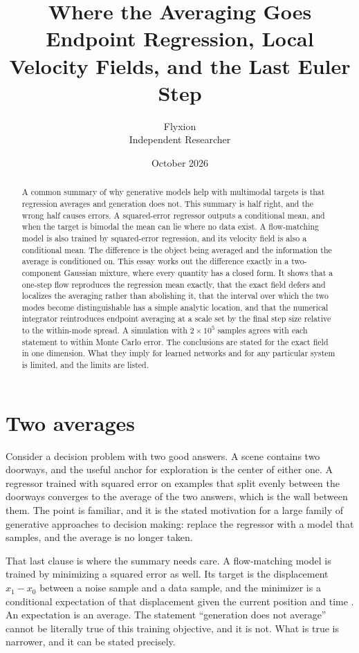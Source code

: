\documentclass[11pt]{article}
\title{Where the Averaging Goes\\[4pt]
\large Endpoint Regression, Local Velocity Fields, and the Last Euler Step}
\author{Flyxion\\Independent Researcher}
\date{October 2026}
\theoremstyle{definition}
\begin{document}
\maketitle

\begin{abstract}
\noindent
A common summary of why generative models help with multimodal targets is that regression averages and generation does not. This summary is half right, and the wrong half causes errors. A squared-error regressor outputs a conditional mean, and when the target is bimodal the mean can lie where no data exist. A flow-matching model is also trained by squared-error regression, and its velocity field is also a conditional mean. The difference is the object being averaged and the information the average is conditioned on. This essay works out the difference exactly in a two-component Gaussian mixture, where every quantity has a closed form. It shows that a one-step flow reproduces the regression mean exactly, that the exact field defers and localizes the averaging rather than abolishing it, that the interval over which the two modes become distinguishable has a simple analytic location, and that the numerical integrator reintroduces endpoint averaging at a scale set by the final step size relative to the within-mode spread. A simulation with $2\times 10^5$ samples agrees with each statement to within Monte Carlo error. The conclusions are stated for the exact field in one dimension. What they imply for learned networks and for any particular system is limited, and the limits are listed.
\end{abstract}

\section{Two averages}

Consider a decision problem with two good answers. A scene contains two doorways, and the useful anchor for exploration is the center of either one. A regressor trained with squared error on examples that split evenly between the doorways converges to the average of the two answers, which is the wall between them. The point is familiar, and it is the stated motivation for a large family of generative approaches to decision making: replace the regressor with a model that samples, and the average is no longer taken.

That last clause is where the summary needs care. A flow-matching model is trained by minimizing a squared error as well. Its target is the displacement $x_1-x_0$ between a noise sample and a data sample, and the minimizer is a conditional expectation of that displacement given the current position and time \citep{lipman2023}. An expectation is an average. The statement ``generation does not average'' cannot be literally true of this training objective, and it is not. What is true is narrower, and it can be stated precisely.
\end{document}
